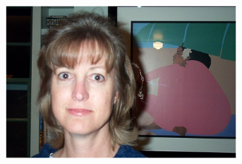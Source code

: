\begin{figure}[H]
\centering

\begin{subfigure}{.4\textwidth}
  \centering
  \includegraphics[width=0.95\textwidth]{img/fd/Original.png}
  \caption{}
\end{subfigure}%


\end{figure}
